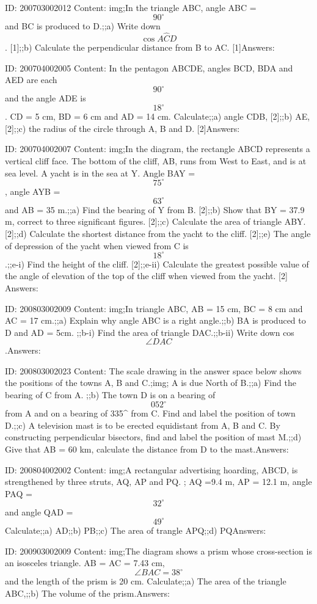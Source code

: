 \documentclass{article}
\begin{document}
ID: 200703002012
Content:
img;In the triangle ABC, angle ABC = $$90^{\circ}$$ and BC is produced to D.;;a) Write down $$\cos A \hat CD$$. [1];;b) Calculate the perpendicular distance from B to AC. [1]Answers:

ID: 200704002005
Content:
In the pentagon ABCDE, angles BCD, BDA and AED are each $$90^{\circ}$$ and the angle ADE is $$18^{\circ}$$. CD = 5 cm, BD = 6 cm and AD = 14 cm. Calculate;;a) angle CDB, [2];;b) AE, [2];;c) the radius of the circle through A, B and D. [2]Answers:

ID: 200704002007
Content:
img;In the diagram, the rectangle ABCD represents a vertical cliff face. The bottom of the cliff, AB, runs from West to East, and is at sea level. A yacht is in the sea at Y. Angle BAY = $$75^{\circ}$$, angle AYB = $$63^{\circ}$$ and AB = 35 m.;;a) Find the bearing of Y from B. [2];;b) Show that BY = 37.9 m, correct to three significant figures. [2];;c) Calculate the area of triangle ABY. [2];;d) Calculate the shortest distance from the yacht to the cliff. [2];;e) The angle of depression of the yacht when viewed from C is $$18^{\circ}$$.;;e-i) Find the height of the cliff. [2];;e-ii) Calculate the greatest possible value of the angle of elevation of the top of the cliff when viewed from the yacht. [2] Answers:

ID: 200803002009
Content:
img;In triangle ABC, AB = 15 cm, BC = 8 cm and AC = 17 cm.;;a) Explain why angle ABC is a right angle.;;b) BA is produced to D and AD = 5cm. ;;b-i) Find the area of triangle DAC.;;b-ii) Write down cos $$\angle DAC$$.Answers:

ID: 200803002023
Content:
The scale drawing in the answer space below shows the positions of the towns A, B and C.;img; A is due North of B.;;a) Find the bearing of C from A. ;;b) The town D is on a bearing of $$052^{\circ}$$ from A and on a bearing of 335^{\circ} from C. Find and label the position of town D.;;c) A television mast is to be erected equidistant from A, B and C. By constructing perpendicular bisectors, find and label the position of mast M.;;d) Give that AB = 60 km, calculate the distance from D to the mast.Answers:

ID: 200804002002
Content:
img;A rectangular advertising hoarding, ABCD, is strengthened by three struts, AQ, AP and PQ. ; AQ =9.4 m, AP = 12.1 m, angle PAQ = $$32^{\circ}$$ and angle QAD = $$49^{\circ}$$ Calculate;;a) AD;;b) PB;;c) The area of trangle APQ;;d) PQAnswers:

ID: 200903002009
Content:
img;The diagram shows a prism whose cross-section is an isosceles triangle. AB = AC = 7.43 cm, $$\angle BAC = 38^{\circ}$$ and the length of the prism is 20 cm. Calculate;;a) The area of the triangle ABC,;;b) The volume of the prism.Answers:
\end{document}
